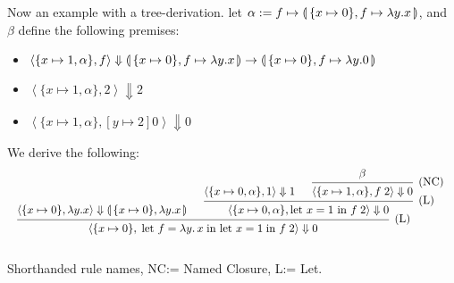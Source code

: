 \newpage
\begin{Example}

    Now an example with a tree-derivation. let $\alpha:= f \mapsto \llparenthesis\,\{x \mapsto 0\},f\mapsto \lambda y.x\,\rrparenthesis$, and $\beta$ define the following premises:
    \begin{itemize}
        \item $\left\langle \{x \mapsto 1, \alpha\}, f \right\rangle \Downarrow \llparenthesis\, \{x \mapsto 0\},f\mapsto\lambda y.x \,\rrparenthesis\to\llparenthesis\, \{x \mapsto 0\},f\mapsto\lambda y.0 \,\rrparenthesis$
        \item $\left\langle \{x \mapsto 1, \alpha\}, 2 \right\rangle \Downarrow 2$
        \item $\left\langle \{x \mapsto 1, \alpha\},[y\mapsto 2]0 \right\rangle \Downarrow 0$
    \end{itemize}
    \noindent
    We derive the following:
\[
\resizebox{\textwidth}{!}{%
    \begin{prooftree}
        \hypo{\left\langle \{x \mapsto 0 \},\lambda y.x\right\rangle\Downarrow \llp\{x \mapsto 0 \},\lambda y.x\rrp}
        \hypo{\left\langle \{x \mapsto 0, \alpha\}, 1 \right\rangle \Downarrow 1}
        
        \hypo{\beta }
        \infer1[(NC)]{\left\langle \{x \mapsto 1, \alpha\}, f\; 2 \right\rangle \Downarrow 0}
        \infer2[\text{(L)}]{\left\langle \{x \mapsto 0, \alpha\},\text{let } x = 1\text{ in } f\; 2 \right\rangle \Downarrow 0}
        \infer2[\text{(L)}]{\left\langle \{ x \mapsto 0 \},\; \text{let } f = \lambda y.\,x\; \text{in let } x = 1\; \text{in } f\; 2 \right\rangle \Downarrow 0}
    \end{prooftree}
    }\]
    \\
    \noindent
    Shorthanded rule names, NC:= Named Closure, L:= Let.
\end{Example}
